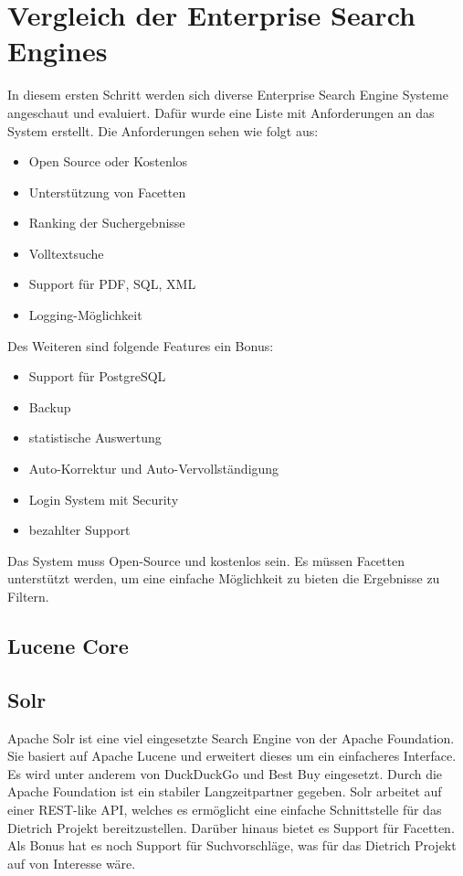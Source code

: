 \chapter{Vergleich der Enterprise Search Engines}

In diesem ersten Schritt werden sich diverse Enterprise Search Engine Systeme angeschaut und evaluiert. Dafür wurde eine Liste mit Anforderungen an das System erstellt. Die Anforderungen sehen wie folgt aus:

\begin{itemize}
    \item Open Source oder Kostenlos
    \item Unterstützung von Facetten
    \item Ranking der Suchergebnisse
    \item Volltextsuche
    \item Support für PDF, SQL, XML
    \item Logging-Möglichkeit
\end{itemize}

Des Weiteren sind folgende Features ein Bonus:

\begin{itemize}
    \item Support für PostgreSQL
    \item Backup
    \item statistische Auswertung
    \item Auto-Korrektur und Auto-Vervollständigung
    \item Login System mit Security
    \item bezahlter Support
\end{itemize}


Das System muss Open-Source und kostenlos sein. Es müssen Facetten unterstützt werden, um eine einfache Möglichkeit zu bieten die Ergebnisse zu Filtern.

\section{Lucene Core}

\section{Solr}

Apache Solr ist eine viel eingesetzte Search Engine von der Apache Foundation. Sie basiert auf Apache Lucene und erweitert dieses um ein einfacheres Interface. Es wird unter anderem von DuckDuckGo und Best Buy eingesetzt. Durch die Apache Foundation ist ein stabiler Langzeitpartner gegeben. 
Solr arbeitet auf einer REST-like API, welches es ermöglicht eine einfache Schnittstelle für das Dietrich Projekt bereitzustellen. Darüber hinaus bietet es Support für Facetten.
Als Bonus hat es noch Support für Suchvorschläge, was für das Dietrich Projekt auf von Interesse wäre.

